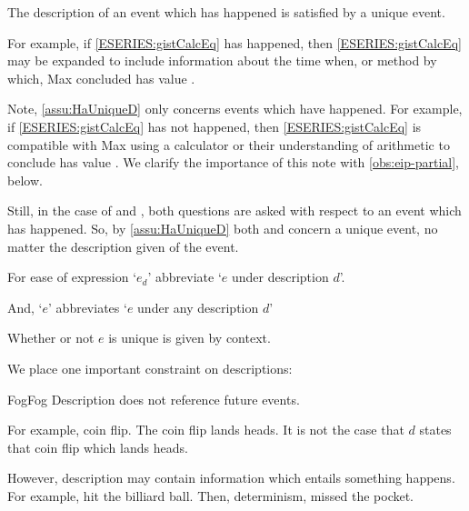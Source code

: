 \begin{note}
  \begin{assumption}%
    \label{assu:HaUniqueD}%
    The description of an event which has happened is satisfied by a unique event.
  \end{assumption}

  For example, if \ref{ESERIES:gistCalcEq} has happened, then \ref{ESERIES:gistCalcEq} may be expanded to include information about the time when, or method by which, Max concluded \gistCalcEq{} has value .

  Note, \autoref{assu:HaUniqueD} only concerns events which have happened.
  For example, if \ref{ESERIES:gistCalcEq} has not happened, then \ref{ESERIES:gistCalcEq} is compatible with Max using a calculator or their understanding of arithmetic to conclude \gistCalcEq{} has value .
  We clarify the importance of this note with \autoref{obs:eip-partial}, below.

  Still, in the case of \qWhy{} and \qHow{}, both questions are asked with respect to an event which has happened.
  So, by \autoref{assu:HaUniqueD} both \qWhy{} and \qHow{} concern a unique event, no matter the description given of the event.
\end{note}


\begin{note}
  \begin{notationList}
  \item
    For ease of expression `\(e_{d}\)' abbreviate `\(e\) under description \(d\)'.

    And, `\(e\)' abbreviates `\(e\) under any description \(d\)'
  \end{notationList}

  Whether or not \(e\) is unique is given by context.
\end{note}




\begin{note}
  We place one important constraint on descriptions:

  \begin{constraint}{Fog}{Fog}
    \label{cons:no-f-ref}
    Description does not reference future events.
  \end{constraint}

  For example, coin flip.
  The coin flip lands heads.
  It is not the case that \(d\) states that coin flip which lands heads.

  However, description may contain information which entails something happens.
  For example, hit the billiard ball.
  Then, determinism, missed the pocket.
\end{note}



